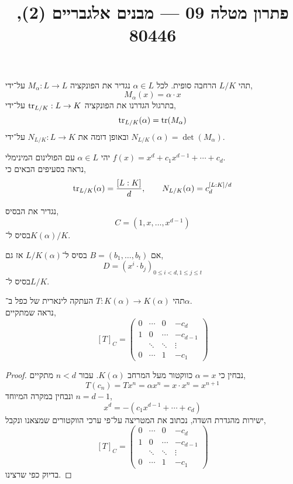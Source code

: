 
\title{פתרון מטלה 09 --- מבנים אלגבריים (2), 80446}


\maketitle
\maketitleprint[red]

\question{}
תהי $L / K$ הרחבה סופית.
לכל $\alpha \in L$ נגדיר את הפונקציה $M_{\alpha} : L \to L$ על־ידי,
\[
	M_{\alpha}(x) = \alpha \cdot x
\]
בתרגול הגדרנו את הפונקציה $\operatorname{tr}_{L / K} : L \to K$ על־ידי,
\[
	\operatorname{tr}_{L / K}(\alpha)
	= \operatorname{tr}(M_{\alpha})
\]
ובאופן דומה את $N_{L / K} : L \to K$ על־ידי $N_{L / K}(\alpha) = \det(M_{\alpha})$.

יהי $\alpha \in L$ עם הפולינום המינימלי $f(x) = x^d + c_1 x^{d - 1} + \cdots + c_d$. \\
נראה בסעיפים הבאים כי,
\[
	\operatorname{tr}_{L / K}(\alpha)
	= \frac{[L : K]}{d},
	\qquad
	N_{L / K}(\alpha)
	= c_d^{[L : K] / d}
\]

\subquestion{}
נגדיר את הבסיס,
\[
	C
	= (1, x, \ldots, x^{d - 1})
\]
בסיס ל־$K(\alpha) / K$.

אם $B = (b_1, \ldots, b_t)$ בסיס ל־$L / K(\alpha)$ אז גם,
\[
	D
	= {( x^i \cdot b_j )}_{0 \le i < d, 1 \le j \le t}
\]
בסיס ל־$L / K$.

\subquestion{}
תהי $T : K(\alpha) \to K(\alpha)$ העתקה לינארית של כפל ב־$\alpha$. \\
נראה שמתקיים,
\[
	{[T]}_C
	= \begin{pmatrix}
		0 & \cdots & 0 & -c_d \\
		1 & 0 & \cdots & -c_{d - 1} \\
		  & \ddots & \ddots & \vdots \\
		0 & \cdots & 1 & -c_1
	\end{pmatrix}
\]
\begin{proof}
	נבחין כי $\alpha = x$ כווקטור מעל המרחב $K(\alpha)$.
	עבור $n < d$ מתקיים,
	\[
		T(c_n)
		= T x^n
		= \alpha x^n
		= x \cdot x^n
		= x^{n + 1}
	\]
	ונבחין במקרה המיוחד $n = d - 1$,
	\[
		x^d
		= -(c_1 x^{d - 1} + \cdots + c_d)
	\]
	ישירות מהגדרת השדה, נכתוב את המטריצה על־פי ערכי הווקטורים שמצאנו ונקבל,
	\[
		{[T]}_C
		= \begin{pmatrix}
			0 & \cdots & 0 & -c_d \\
			1 & 0 & \cdots & -c_{d - 1} \\
			  & \ddots & \ddots & \vdots \\
			0 & \cdots & 1 & -c_1
		\end{pmatrix} 
	\]
	בדיוק כפי שרצינו.
\end{proof}

